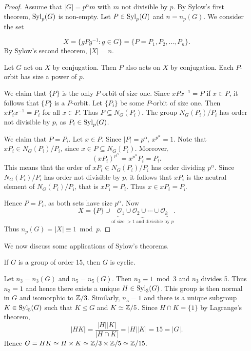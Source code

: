 \begin{proof}
    Assume that $|G|=p^{\alpha}m$ with $m$ not divisible by $p$.
    By Sylow's first theorem, $\mathrm{Syl}_p(G)$ is non-empty. Let $P\in\mathrm{Syl}_p(G)$ and $n=n_p(G)$. We consider the set  
    
        \[
        X=\{gPg^{-1}:g\in G\}=\{P=P_1,P_2,\dots,P_n\}.
        \]
    By Sylow's second theorem, $|X|=n$.

    Let $G$ act on $X$ by conjugation. Then $P$ also acts on 
    $X$ by conjugation. Each $P$-orbit has size a power of $p$. 
    
    We claim that $\{P\}$ is the only $P$-orbit of size one.  
    Since $xPx^{-1}=P$ if $x\in P$, it follows that
    $\{P\}$ is a $P$-orbit. Let $\{P_i\}$ be some $P$-orbit
    of size one. Then 
        $xP_ix^{-1}=P_i$ for all 
        $x\in P$. Thus $P\subseteq N_G(P_i)$. The group 
        $N_G(P_i)/P_i$ has order not divisible by $p$, as $P_i\in\mathrm{Syl}_p(G)$. 
        
        We claim that $P=P_i$. Let 
        $x\in P$. Since
        $|P|=p^\alpha$, $x^{p^{\alpha}}=1$. 
        Note that $xP_i\in N_G(P_i)/P_i$, since $x\in P\subseteq N_G(P_i)$. Moreover, 
        \[
        (xP_i)^{p^{\alpha}}=x^{p^{\alpha}}P_i=P_i.
        \]
        This means that the order of 
        $xP_i\in N_G(P_i)/P_i$ has order dividing $p^{\alpha}$. Since 
        $N_G(P_i)/P_i$ has order not divisible by $p$, it follows 
        that $xP_i$ is the neutral element of $N_G(P_i)/P_i$, that is $xP_i=P_i$. Thus
        $x\in xP_i=P_i$. 
                 
        
        Hence $P=P_i$, as both sets 
        have size $p^{\alpha}$. Now 
        \[
        X=\{P\}\cup \underbrace{\mathcal{O}_1\cup\mathcal{O}_2\cup\cdots\cup\mathcal{O}_k}_{\text{of size $>1$ and divisible by $p$}}.
        \]
        Thus $n_p(G)=|X|\equiv 1\bmod p$.
\end{proof}

We now discuss some applications of Sylow's theorems. 

\begin{example}
If $G$ is a group of order 15, then $G$ is cyclic.

Let $n_3=n_3(G)$ and $n_5=n_5(G)$. Then $n_3\equiv1\bmod 3$ and $n_3$ divides 5. Thus $n_3=1$ and hence there exists a unique
$H\in\mathrm{Syl}_3(G)$. This group is then normal in $G$ and isomorphic to
$\mathbb{Z}/3$. Similarly, 
 $n_5=1$ and there is a unique subgroup $K\in\mathrm{Syl}_5(G)$ such that
 $K\unlhd G$ and $K\simeq\mathbb{Z}/5$. Since $H\cap K=\{1\}$ by Lagrange's theorem, 
 \[
|HK|=\frac{|H||K|}{|H\cap K|}=|H||K|=15=|G|.
\]
Hence $G=HK\simeq H\times K\simeq \mathbb{Z}/3\times\mathbb{Z}/5\simeq\mathbb{Z}/15$.
\end{example}

